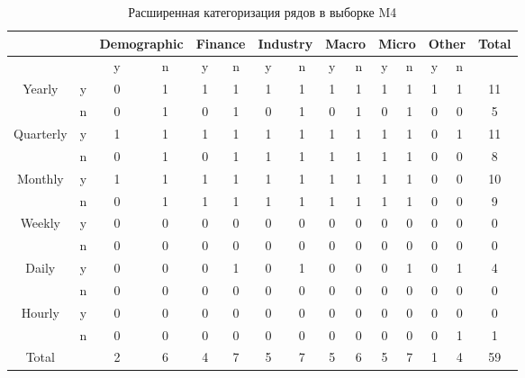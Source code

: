 \documentclass[a4paper,14pt]{extarticle}
\begin{document}
	\begin{table}[!h]
		\captionsetup{justification=centering}
		\centering
		\caption{Расширенная категоризация рядов в выборке M4}
		\begin{tabular}{ccccccccccccccc}
			\hline 
			\multicolumn{2}{c}{} & \multicolumn{2}{c}{Demographic} & \multicolumn{2}{c}{Finance} & \multicolumn{2}{c}{Industry} & \multicolumn{2}{c}{Macro} & \multicolumn{2}{c}{Micro} & \multicolumn{2}{c}{Other} & Total\\ 
			\hline 
			\multicolumn{2}{c}{} 			& y & n & y & n & y & n & y & n & y & n & y & n &  \\
			\multirow{2}{*}{Yearly} 	& y & 0 & 1 & 1 & 1 & 1 & 1 & 1 & 1 & 1 & 1 & 1 & 1 & 11\\
										 & n & 0 & 1 & 0 & 1 & 0 & 1 & 0 & 1 & 0 & 1 & 0 & 0 & 5\\
			\multirow{2}{*}{Quarterly} 	& y & 1 & 1 & 1 & 1 & 1 & 1 & 1 & 1 & 1 & 1 & 0 & 1 & 11\\
										 & n & 0 & 1 & 0 & 1 & 1 & 1 & 1 & 1 & 1 & 1 & 0 & 0 & 8\\
			\multirow{2}{*}{Monthly} 	& y & 1 & 1 & 1 & 1 & 1 & 1 & 1 & 1 & 1 & 1 & 0 & 0 & 10\\
										 & n & 0 & 1 & 1 & 1 & 1 & 1 & 1 & 1 & 1 & 1 & 0 & 0 & 9\\
			\multirow{2}{*}{Weekly} 	& y & 0 & 0 & 0 & 0 & 0 & 0 & 0 & 0 & 0 & 0 & 0 & 0 & 0\\
										 & n & 0 & 0 & 0 & 0 & 0 & 0 & 0 & 0 & 0 & 0 & 0 & 0 & 0\\
			\multirow{2}{*}{Daily}  	& y & 0 & 0 & 0 & 1 & 0 & 1 & 0 & 0 & 0 & 1 & 0 & 1 & 4\\
										 & n & 0 & 0 & 0 & 0 & 0 & 0 & 0 & 0 & 0 & 0 & 0 & 0 & 0\\
			\multirow{2}{*}{Hourly} 	& y & 0 & 0 & 0 & 0 & 0 & 0 & 0 & 0 & 0 & 0 & 0 & 0 & 0\\
										 & n & 0 & 0 & 0 & 0 & 0 & 0 & 0 & 0 & 0 & 0 & 0 & 1 & 1\\
			Total 				 		&   & 2 & 6 & 4 & 7 & 5 & 7 & 5 & 6 & 5 & 7 & 1 & 4 & 59\\
			\hline
		\end{tabular}
		\label{exp:m4_clusterized}
	\end{table}
\end{document}
